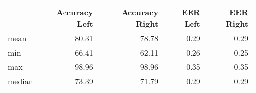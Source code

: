 \begin{tabular}{lrrrr}
\toprule
{} &  Accuracy Left &  Accuracy Right &  EER Left &  EER Right \\
\midrule
mean   &          80.31 &           78.78 &      0.29 &       0.29 \\
min    &          66.41 &           62.11 &      0.26 &       0.25 \\
max    &          98.96 &           98.96 &      0.35 &       0.35 \\
median &          73.39 &           71.79 &      0.29 &       0.29 \\
\bottomrule
\end{tabular}
